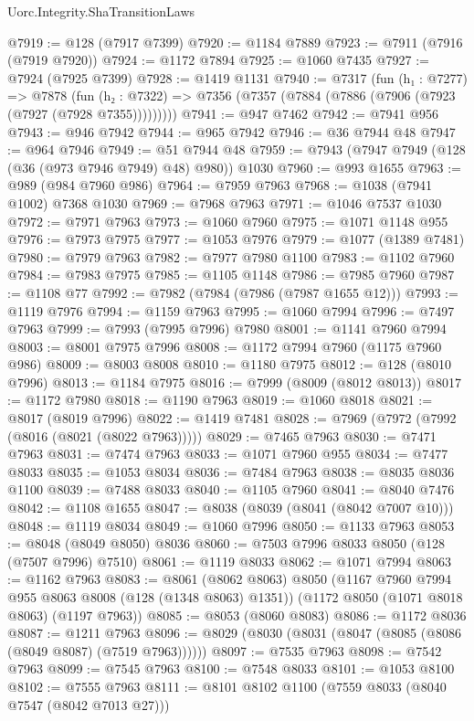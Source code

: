 \begin{lexlean}{Uorc.Integrity.ShaTransitionLaws}
\begin{coremodule}
@7919 := @128 (@7917 @7399)
@7920 := @1184 @7889
@7923 := @7911 (@7916 (@7919 @7920))
@7924 := @1172 @7894
@7925 := @1060 @7435
@7927 := @7924 (@7925 @7399)
@7928 := @1419 @1131
@7940 := @7317
    (fun (h₁ : @7277) =>
    @7878 (fun (h₂ : @7322) => @7356 (@7357 (@7884 (@7886 (@7906 (@7923 (@7927 (@7928 @7355)))))))))
@7941 := @947 @7462
@7942 := @7941 @956
@7943 := @946 @7942
@7944 := @965 @7942
@7946 := @36 @7944 @48
@7947 := @964 @7946
@7949 := @51 @7944 @48
@7959 := @7943 (@7947 @7949 (@128 (@36 (@973 @7946 @7949) @48) @980)) @1030
@7960 := @993 @1655
@7963 := @989 (@984 @7960 @986)
@7964 := @7959 @7963
@7968 := @1038 (@7941 @1002) @7368 @1030
@7969 := @7968 @7963
@7971 := @1046 @7537 @1030
@7972 := @7971 @7963
@7973 := @1060 @7960
@7975 := @1071 @1148 @955
@7976 := @7973 @7975
@7977 := @1053 @7976
@7979 := @1077 (@1389 @7481)
@7980 := @7979 @7963
@7982 := @7977 @7980 @1100
@7983 := @1102 @7960
@7984 := @7983 @7975
@7985 := @1105 @1148
@7986 := @7985 @7960
@7987 := @1108 @77
@7992 := @7982 (@7984 (@7986 (@7987 @1655 @12)))
@7993 := @1119 @7976
@7994 := @1159 @7963
@7995 := @1060 @7994
@7996 := @7497 @7963
@7999 := @7993 (@7995 @7996) @7980
@8001 := @1141 @7960 @7994
@8003 := @8001 @7975 @7996
@8008 := @1172 @7994 @7960 (@1175 @7960 @986)
@8009 := @8003 @8008
@8010 := @1180 @7975
@8012 := @128 (@8010 @7996)
@8013 := @1184 @7975
@8016 := @7999 (@8009 (@8012 @8013))
@8017 := @1172 @7980
@8018 := @1190 @7963
@8019 := @1060 @8018
@8021 := @8017 (@8019 @7996)
@8022 := @1419 @7481
@8028 := @7969 (@7972 (@7992 (@8016 (@8021 (@8022 @7963)))))
@8029 := @7465 @7963
@8030 := @7471 @7963
@8031 := @7474 @7963
@8033 := @1071 @7960 @955
@8034 := @7477 @8033
@8035 := @1053 @8034
@8036 := @7484 @7963
@8038 := @8035 @8036 @1100
@8039 := @7488 @8033
@8040 := @1105 @7960
@8041 := @8040 @7476
@8042 := @1108 @1655
@8047 := @8038 (@8039 (@8041 (@8042 @7007 @10)))
@8048 := @1119 @8034
@8049 := @1060 @7996
@8050 := @1133 @7963
@8053 := @8048 (@8049 @8050) @8036
@8060 := @7503 @7996 @8033 @8050 (@128 (@7507 @7996) @7510)
@8061 := @1119 @8033
@8062 := @1071 @7994
@8063 := @1162 @7963
@8083 := @8061
    (@8062 @8063)
    @8050
    (@1167 @7960 @7994 @955 @8063 @8008 (@128 (@1348 @8063) @1351))
    (@1172 @8050 (@1071 @8018 @8063) (@1197 @7963))
@8085 := @8053 (@8060 @8083)
@8086 := @1172 @8036
@8087 := @1211 @7963
@8096 := @8029 (@8030 (@8031 (@8047 (@8085 (@8086 (@8049 @8087) (@7519 @7963))))))
@8097 := @7535 @7963
@8098 := @7542 @7963
@8099 := @7545 @7963
@8100 := @7548 @8033
@8101 := @1053 @8100
@8102 := @7555 @7963
@8111 := @8101 @8102 @1100 (@7559 @8033 (@8040 @7547 (@8042 @7013 @27)))

\end{coremodule}
\end{lexlean}
